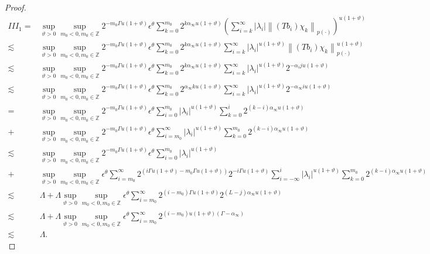 \documentclass[10pt,a4paper]{amsart}
\begin{document}
\begin{proof}
\begin{align*}
I I I_{1}= & \sup_{\vartheta>0 }\sup _{m_0<0, m_0\in  \mathbb{Z}} 2^{-m_0\Gamma u(1+\vartheta)} \epsilon  ^\theta \sum_{k=0}^{m_0} 2^{k  \alpha_{\infty}u(1+\vartheta)}\left(\sum_{i=k}^{\infty}\left|\lambda_{i}\right|\left\|\left(T b_{i}\right) \chi_{k}\right\|_{{p(\cdot)}}\right)^{u(1+\vartheta)} \\
\lesssim & \sup_{\vartheta>0 }\sup _{m_0<0, m_0\in  \mathbb{Z}} 2^{-m_0\Gamma u(1+\vartheta)} \epsilon  ^\theta \sum_{k=0}^{m_0} 2^{k\alpha_{\infty} u(1+\vartheta) } \sum_{i=k}^{\infty}\left|\lambda_{i}\right|^{u(1+\vartheta)}\left\|\left(T b_{i}\right) \chi_{k}\right\|_{{p(\cdot)}}^{u(1+\vartheta)} \\
\lesssim & \sup_{\vartheta>0 }\sup _{m_0<0, m_0\in  \mathbb{Z}} 2^{-m_0\Gamma u(1+\vartheta)} \epsilon  ^\theta \sum_{k=0}^{m_0} 2^{k\alpha_{\infty}u(1+\vartheta)  } \sum_{i=k}^{\infty}\left|\lambda_{i}\right|^{u(1+\vartheta)} 2^{-\alpha_{i}j  u(1+\vartheta)} \\
\lesssim & \sup_{\vartheta>0 }\sup _{m_0<0, m_0\in  \mathbb{Z}} 2^{-m_0\Gamma u(1+\vartheta)} \epsilon  ^\theta \sum_{k=0}^{m_0} 2^{\alpha_{\infty} k u(1+\vartheta)} \sum_{i=k}^{\infty}\left|\lambda_{i}\right|^{u(1+\vartheta)} 2^{-\alpha_{\infty} iu (1+\vartheta)} \\
= & \sup_{\vartheta>0 }\sup _{m_0<0, m_0\in  \mathbb{Z}} 2^{-m_0\Gamma u(1+\vartheta)} \epsilon  ^\theta \sum_{i=0}^{m_0}\left|\lambda_{i}\right|^{u(1+\vartheta)} \sum_{k=0}^{i} 2^{(k-i) \alpha_{\infty} u(1+\vartheta)} \\
+ & \sup_{\vartheta>0 }\sup _{m_0<0, m_0\in  \mathbb{Z}} 2^{-m_0\Gamma u(1+\vartheta)} \epsilon  ^\theta \sum_{i=m_0}^{\infty}\left|\lambda_{i}\right|^{u(1+\vartheta)} \sum_{k=0}^{m_0} 2^{(k-i) \alpha_{\infty} u(1+\vartheta)} \\
\lesssim & \sup_{\vartheta>0 }\sup _{m_0<0, m_0\in  \mathbb{Z}} 2^{-m_0\Gamma u(1+\vartheta)} \epsilon  ^\theta \sum_{i=0}^{m_0}\left|\lambda_{i}\right|^{u(1+\vartheta)} \\
+ &\sup_{\vartheta>0 }\sup _{m_0<0, m_0\in  \mathbb{Z}} \epsilon  ^\theta \sum_{i=m_0}^{\infty} 2^{(i\Gamma  u(1+\vartheta)-m_0\Gamma u(1+\vartheta))} 2^{-i\Gamma  u(1+\vartheta)} \sum_{i=-\infty}^{i}\left|\lambda_{i}\right|^{u(1+\vartheta)} \sum_{k=0}^{m_0} 2^{(k-i) \alpha_{\infty} u(1+\vartheta)} \\
\lesssim & \Lambda+\Lambda \sup_{\vartheta>0 }\sup _{m_0<0, m_0\in  \mathbb{Z}} \epsilon  ^\theta \sum_{i=m_0}^{\infty} 2^{(i-m_0) \Gamma u(1+\vartheta)} 2^{(L-j) \alpha_{\infty} u(1+\vartheta)} \\
\lesssim & \Lambda+\Lambda \sup_{\vartheta>0 }\sup _{m_0<0, m_0\in  \mathbb{Z}} \epsilon  ^\theta \sum_{i=m_0}^{\infty} 2^{(i-m_0) u(1+\vartheta)\left(\Gamma-\alpha_{\infty}\right)} \\
\lesssim & \Lambda .
\end{align*}



\end{proof}
\end{document}
